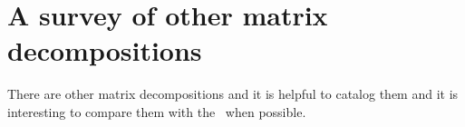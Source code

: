 \chapter[Other matrix decompositions]{A survey of other matrix decompositions}

There are other matrix decompositions and it is helpful to catalog them and it is interesting to compare them with the \svdl \ when possible.

\begin{table}[htdp]
\begin{center}
\end{center}
\label{tab:decomp:compare}
\caption{Comparing the limitations on the target matrix for different decompositions. The quality of the target matrix relaxes as one goes down the list. The \svdl is clearly the most robust tool. This universality comes at a steep computational price.}
\end{table}%










\endinput
